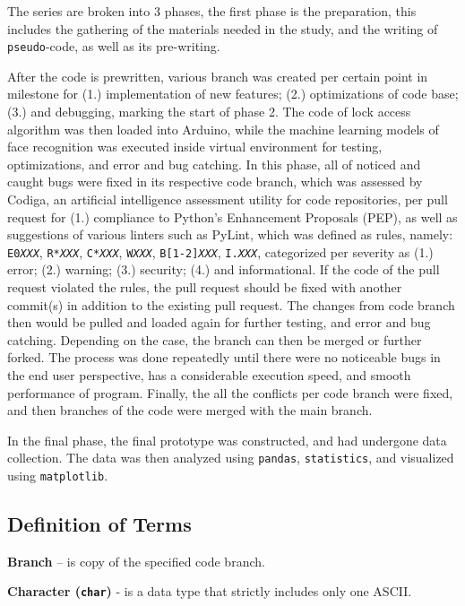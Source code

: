 \documentclass[12pt]{article}
\begin{document}
The series are broken into 3 phases, the first phase is the preparation, this includes the gathering of the materials needed in the study, and the writing of \texttt{pseudo}-code, as well as its pre-writing.

After the code is prewritten, various branch was created per certain point in milestone for (1.) implementation of new features; (2.) optimizations of code base; (3.) and debugging, marking the start of phase 2. The code of lock access algorithm was then loaded into Arduino, while the machine learning models of face recognition was executed inside virtual environment for testing, optimizations, and error and bug catching. In this phase, all of noticed and caught bugs were fixed in its respective code branch, which was assessed by Codiga, an artificial intelligence assessment utility for code repositories, per pull request for (1.) compliance to Python's Enhancement Proposals (PEP), as well as suggestions of various linters such as PyLint, which was defined as rules, namely: \texttt{E0\emph{XXX}}, \texttt{R*\emph{XXX}}, \texttt{C*\emph{XXX}}, \texttt{W\emph{XXX}}, \texttt{B[1-2]\emph{XXX}}, \texttt{I.\emph{XXX}}, categorized per severity as (1.) error; (2.) warning; (3.) security; (4.) and informational. If the code of the pull request violated the rules, the pull request should be fixed with another commit(s) in addition to the existing pull request. The changes from code branch then would be pulled and loaded again for further testing, and error and bug catching. Depending on the case, the branch can then be merged or further forked. The process was done repeatedly until there were no noticeable bugs in the end user perspective, has a considerable execution speed, and smooth performance of program. Finally, the all the conflicts per code branch were fixed, and then branches of the code were merged with the main branch.

In the final phase, the final prototype was constructed, and had undergone data collection. The data was then analyzed using \texttt{pandas}, \texttt{statistics}, and visualized using \texttt{matplotlib}.

\subsection*{Definition of Terms\centering}

\textbf{Branch} – is copy of the specified code branch.

\textbf{Character (\texttt{char})} - is a data type that strictly includes only one ASCII.
\end{document}
